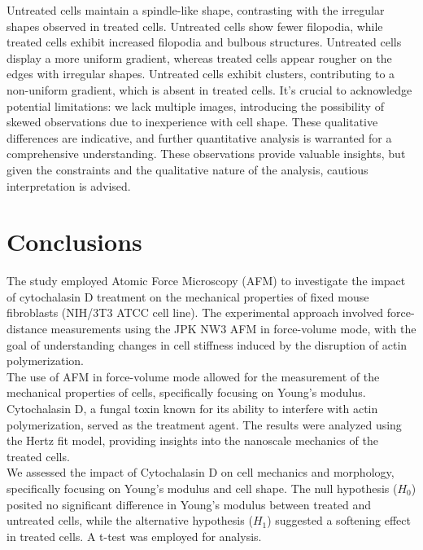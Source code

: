 \documentclass[a4paper,english,12pt,bibliography=totoc]{scrreprt}
\begin{document}
Untreated cells maintain a spindle-like shape, contrasting with the irregular shapes observed in treated cells.
Untreated cells show fewer filopodia, while treated cells exhibit increased filopodia and bulbous structures.
Untreated cells display a more uniform gradient, whereas treated cells appear rougher on the edges with irregular shapes.
Untreated cells exhibit clusters, contributing to a non-uniform gradient, which is absent in treated cells.
It's crucial to acknowledge potential limitations: we lack multiple images, introducing the possibility of skewed observations due to inexperience with cell shape. These qualitative differences are indicative, and further quantitative analysis is warranted for a comprehensive understanding.
These observations provide valuable insights, but given the constraints and the qualitative nature of the analysis, cautious interpretation is advised.


\chapter{Conclusions}
\label{cha:conclusions}
The study employed Atomic Force Microscopy (AFM) to investigate the impact of cytochalasin D treatment on the mechanical properties of fixed mouse fibroblasts (NIH/3T3 ATCC cell line). The experimental approach involved force-distance measurements using the JPK NW3 AFM in force-volume mode, with the goal of understanding changes in cell stiffness induced by the disruption of actin polymerization.\\

The use of AFM in force-volume mode allowed for the measurement of the mechanical properties of cells, specifically focusing on Young's modulus. Cytochalasin D, a fungal toxin known for its ability to interfere with actin polymerization, served as the treatment agent. The results were analyzed using the Hertz fit model, providing insights into the nanoscale mechanics of the treated cells.\\

We assessed the impact of Cytochalasin D on cell mechanics and morphology, specifically focusing on Young's modulus and cell shape. The null hypothesis ($H_0$) posited no significant difference in Young's modulus between treated and untreated cells, while the alternative hypothesis ($H_1$) suggested a softening effect in treated cells. A t-test was employed for analysis.\\
\end{document}
